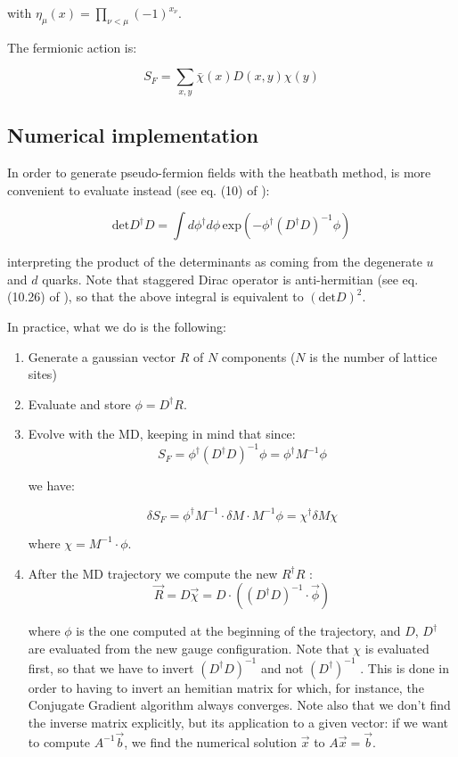 \documentclass[12pt, a4paper]{article}
\begin{document}
with $\eta_{\mu}(x) = \prod_{\nu<\mu} (-1)^{x_{\nu}}$.

The fermionic action is:

$$
S_F = \sum_{x, y} \bar{\chi}(x) D(x,y) \chi(y)
$$

\subsection{Numerical implementation}

In order to generate pseudo-fermion fields with the heatbath method, is more convenient to evaluate instead (see eq. (10) of \HMCref{}):

$$
\text{det} D^{\dagger} D = 
\int d \phi^{\dagger} d \phi 
\, \text{exp}(-\phi^{\dagger} (D^{\dagger} D)^{-1} \phi)
$$

interpreting the product of the determinants as coming from the degenerate $u$ and $d$ quarks. Note that staggered Dirac operator is anti-hermitian (see eq. (10.26) of \GLref{}), so that the above integral is equivalent to $( \text{det} D)^2$.

In practice, what we do is the following:

\begin{enumerate}
    \item
    Generate a gaussian vector $R$ of $N$ components ($N$ is the number of lattice sites)
    \item
    Evaluate and store $\phi = D^{\dagger} R$.
    \item
    Evolve with the MD, keeping in mind that since:
    $$
    S_F = 
    \phi^{\dagger} (D^{\dagger} D)^{-1} \phi = 
    \phi^{\dagger} M^{-1} \phi
    $$
    
    we have:
    
    $$
    \delta S_F 
    = \phi^{\dagger} M^{-1} \cdot \delta M \cdot M^{-1} \phi 
    = \chi^{\dagger} \delta M \chi
    $$
    
    where $\chi = M^{-1} \cdot \phi$.
    \item
    After the MD trajectory we compute the new $R^{\dagger} R$ :
    $$
    \vec{R} = D \vec{\chi} = D \cdot ( (D^{\dagger} D)^{-1} \cdot \vec{\phi})
    $$
    
    where $\phi$ is the one computed at the beginning of the trajectory, and $D$, $D^{\dagger}$ are evaluated from the new gauge configuration. Note that $\chi$ is evaluated first, so that we have to invert $(D^{\dagger} D)^{-1}$ and not $(D^{\dagger})^{-1}$ . This is done in order to having to invert an hemitian matrix for which, for instance, the Conjugate Gradient algorithm always converges.
    Note also that we don't find the inverse matrix explicitly, but its application to a given vector: if we want to compute $A^{-1} \vec{b}$, we find the numerical solution $\vec{x}$ to $A \vec{x} = \vec{b}$.
\end{enumerate}
\end{document}
